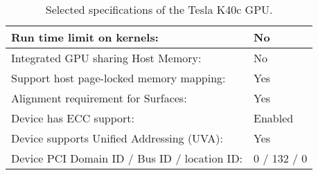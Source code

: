 \begin{table}
\begin{tabular}{l|l}
  Run time limit on kernels:                   &  No\\ \hline
  Integrated GPU sharing Host Memory:          &  No\\ \hline
  Support host page-locked memory mapping:     &  Yes\\ \hline
  Alignment requirement for Surfaces:          &  Yes\\ \hline
  Device has ECC support:                      &  Enabled\\ \hline
  Device supports Unified Addressing (UVA):    &  Yes\\ \hline
  Device PCI Domain ID / Bus ID / location ID: &  0 / 132 / 0\\ 
\end{tabular}
\caption{Selected specifications of the Tesla K40c GPU.}
\label{tab:gpuspecs}
\end{table}